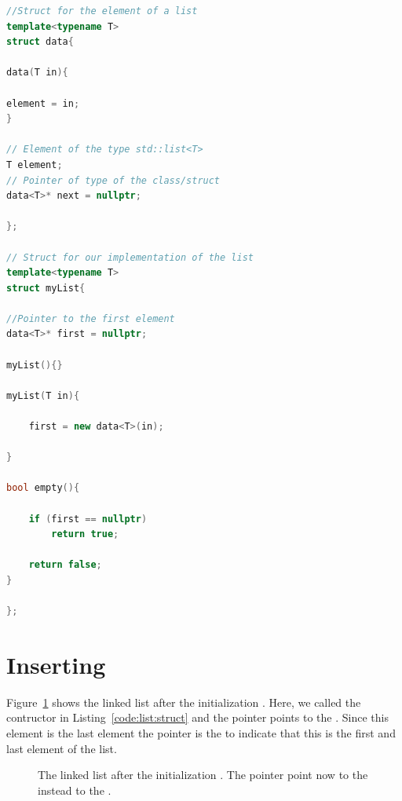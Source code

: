 \documentclass[11pt,fleqn]{book} %
\begin{document}
\begin{lstlisting}[language=c++,caption={Example for a structure for a three dimensional vector.\label{code:list:struct}},float,floatplacement=tb]
//Struct for the element of a list
template<typename T>
struct data{

data(T in){

element = in;
}

// Element of the type std::list<T>
T element;
// Pointer of type of the class/struct
data<T>* next = nullptr;

};

// Struct for our implementation of the list
template<typename T>
struct myList{

//Pointer to the first element
data<T>* first = nullptr;

myList(){}

myList(T in){

	first = new data<T>(in);

}

bool empty(){

	if (first == nullptr)
		return true;
	
	return false;
}

};
\end{lstlisting}

\section*{Inserting}

Figure~\ref{fig:sketch:linked:list:init} shows the linked list after the initialization . Here, we called the contructor in Listing~\ref{code:list:struct} and the pointer  points to the . Since this element is the last element the pointer  is the  to indicate that this is the first and last element of the list.

\begin{figure}[h]
\centering
{}
\caption{The linked list after the initialization . The pointer  point now to the  instead to the .}
\label{fig:sketch:linked:list:init}
\end{figure}
\end{document}
